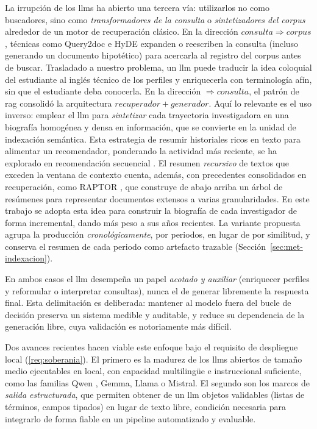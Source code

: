 La irrupción de los \glspl{llm} \citep{brown2020gpt3} ha abierto una tercera vía: utilizarlos no como buscadores, sino como \emph{transformadores de la consulta} o \emph{sintetizadores del corpus} alrededor de un motor de recuperación clásico.
En la dirección $consulta\Rightarrow corpus$, técnicas como Query2doc \citep{wang2023query2doc} e HyDE \citep{gao2023hyde} expanden o reescriben la consulta (incluso generando un documento hipotético) para acercarla al registro del corpus antes de buscar. Trasladado a nuestro problema, un \gls{llm} puede traducir la idea coloquial del estudiante al inglés técnico de los perfiles y enriquecerla con terminología afín, sin que el estudiante deba conocerla.
En la dirección $\Rightarrow consulta$, el patrón de \gls{rag} \citep{lewis2020rag} consolidó la arquitectura $recuperador+generador$. Aquí lo relevante es el uso inverso: emplear el \gls{llm} para \emph{sintetizar} cada trayectoria investigadora en una biografía homogénea y densa en información, que se convierte en la unidad de indexación semántica.
Esta estrategia de resumir historiales ricos en texto para alimentar un recomendador, ponderando la actividad más reciente, se ha explorado en recomendación secuencial \citep{zheng2024harnessing}.
El resumen \emph{recursivo} de textos que exceden la ventana de contexto cuenta, además, con precedentes consolidados en recuperación, como RAPTOR \citep{sarthi2024raptor}, que construye de abajo arriba un árbol de resúmenes para representar documentos extensos a varias granularidades.
En este trabajo se adopta esta idea para construir la biografía de cada investigador de forma incremental, dando más peso a sus años recientes.
La variante propuesta agrupa la producción \emph{cronológicamente}, por periodos, en lugar de por similitud, y conserva el resumen de cada periodo como artefacto trazable (Sección~\ref{sec:met-indexacion}).

En ambos casos el \gls{llm} desempeña un papel \emph{acotado y auxiliar} (enriquecer perfiles y reformular o interpretar consultas), nunca el de generar libremente la respuesta final.
Esta delimitación es deliberada: mantener al modelo fuera del bucle de decisión preserva un sistema medible y auditable, y reduce su dependencia de la generación libre, cuya validación es notoriamente más difícil.

Dos avances recientes hacen viable este enfoque bajo el requisito de despliegue local (\ref{req:soberania}).
El primero es la madurez de los \glspl{llm} abiertos de tamaño medio ejecutables en local, con capacidad multilingüe e instruccional suficiente, como las familias Qwen \citep{qwen2025qwen25}, Gemma, Llama o Mistral.
El segundo son los marcos de \emph{salida estructurada}, que permiten obtener de un \gls{llm} objetos validables (listas de términos, campos tipados) en lugar de texto libre, condición necesaria para integrarlo de forma fiable en un pipeline automatizado y evaluable.

